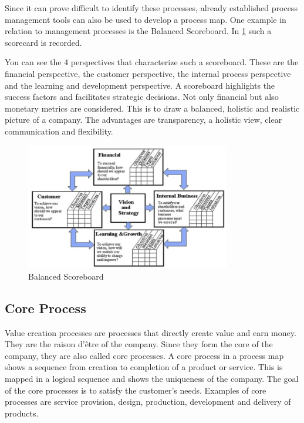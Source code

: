 \documentclass[11pt,a4paper]{article}
\begin{document}
Since it can prove difficult to identify these processes, already established
process management tools can also be used to develop a process map. One
example in relation to management processes is the Balanced Scoreboard. In
\ref{balance} such a scorecard is recorded.

You can see the 4 perspectives that characterize such a scoreboard. These are
the financial perspective, the customer perspective, the internal process
perspective and the learning and development perspective. A scoreboard
highlights the success factors and facilitates strategic decisions. Not only
financial but also monetary metrics are considered. This is to draw a
balanced, holistic and realistic picture of a company. The advantages are
transparency, a holistic view, clear communication and flexibility.

\begin{figure}[h] 
  \centering
     \includegraphics[width=0.8\textwidth]{BALANCED-SCORECARD-FRAMEWORK.png}
  \caption{Balanced Scoreboard \cite{9}}
  \label{balance}
\end{figure}

\subsection{Core Process}

Value creation processes are processes that directly create value and earn
money. They are the raison d'être of the company. Since they form the core of
the company, they are also called core processes. A core process in a process
map shows a sequence from creation to completion of a product or service. This
is mapped in a logical sequence and shows the uniqueness of the company. The
goal of the core processes is to satisfy the customer's needs. Examples of
core processes are service provision, design, production, development and
delivery of products.
\end{document}
